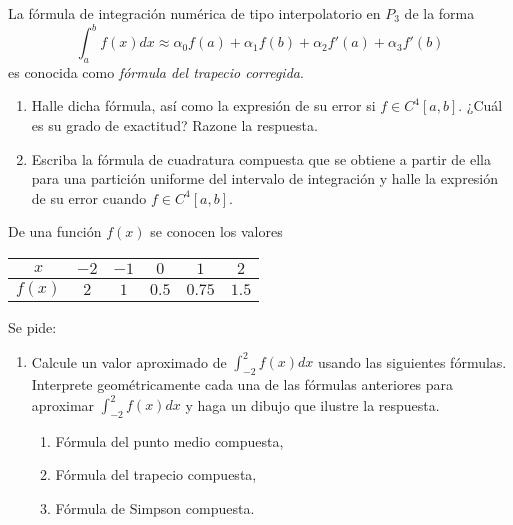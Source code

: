 \begin{ejercicio}\label{ej:2.1.16}
    La fórmula de integración numérica de tipo interpolatorio en $P_3$ de la forma
    \begin{equation*}
        \int_{a}^{b} f(x) dx \approx \alpha_0 f(a) + \alpha_1 f(b) + \alpha_2 f'(a) + \alpha_3 f'(b)
    \end{equation*}
    es conocida como \emph{fórmula del trapecio corregida}.
    \begin{enumerate}
        \item Halle dicha fórmula, así como la expresión de su error si $f \in C^4[a, b]$. ¿Cuál es su grado de exactitud? Razone la respuesta.
        \item Escriba la fórmula de cuadratura compuesta que se obtiene a partir de ella para una partición uniforme del intervalo de integración y halle la expresión de su error cuando $f \in C^4[a, b]$.
    \end{enumerate}
\end{ejercicio}

\begin{ejercicio}\label{ej:2.1.17}
    De una función $f(x)$ se conocen los valores
    \begin{center}
        \begin{tabular}{c|c|c|c|c|c}
            $x$ & $-2$ & $-1$ & $0$ & $1$ & $2$ \\
            \hline
            $f(x)$ & $2$ & $1$ & $0.5$ & $0.75$ & $1.5$
        \end{tabular}
    \end{center}
    Se pide:
    \begin{enumerate}
        \item Calcule un valor aproximado de $\int_{-2}^{2} f(x) dx$ usando las siguientes fórmulas. Interprete geométricamente cada una de las fórmulas anteriores para aproximar $\int_{-2}^{2} f(x) dx$ y haga un dibujo que ilustre la respuesta.
        \begin{enumerate}
            \item Fórmula del punto medio compuesta,
            \item Fórmula del trapecio compuesta,
            \item Fórmula de Simpson compuesta.
        \end{enumerate}
    \end{enumerate}
\end{ejercicio}

